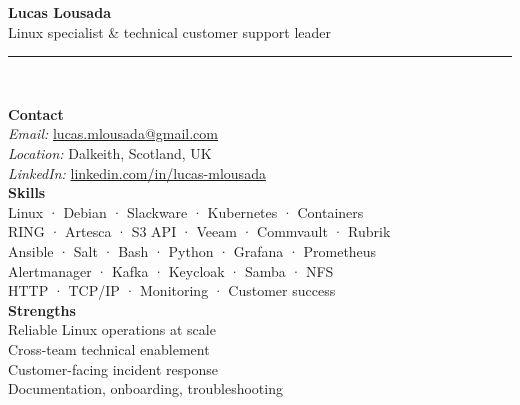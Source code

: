 \documentclass[9pt,a4paper]{article}
\begin{document}
{\color{accent}\LARGE\bfseries Lucas Lousada}\\[0.25em]
{\large Linux specialist \& technical customer support leader}\\[0.75em]
\noindent\rule{\linewidth}{0.5pt}\\[0.7em]
\begin{minipage}[t]{0.33\textwidth}
  \textbf{Contact}\\
  \vspace{0.15em}
  \textit{Email:} \href{mailto:lucas.mlousada@gmail.com}{lucas.mlousada@gmail.com}\\
  \textit{Location:} Dalkeith, Scotland, UK\\
  \textit{LinkedIn:} \href{https://www.linkedin.com/in/lucas-mlousada/}{linkedin.com/in/lucas-mlousada}\\[0.75em]
  \textbf{Skills}\\
  Linux · Debian · Slackware · Kubernetes · Containers \\
  RING · Artesca · S3 API · Veeam · Commvault · Rubrik \\
  Ansible · Salt · Bash · Python · Grafana · Prometheus \\
  Alertmanager · Kafka · Keycloak · Samba · NFS \\
  HTTP · TCP/IP · Monitoring · Customer success\\[0.75em]
  \textbf{Strengths}\\
  Reliable Linux operations at scale\\
  Cross-team technical enablement\\
  Customer-facing incident response\\
  Documentation, onboarding, troubleshooting\\
\end{minipage}
\hfill
\end{document}

